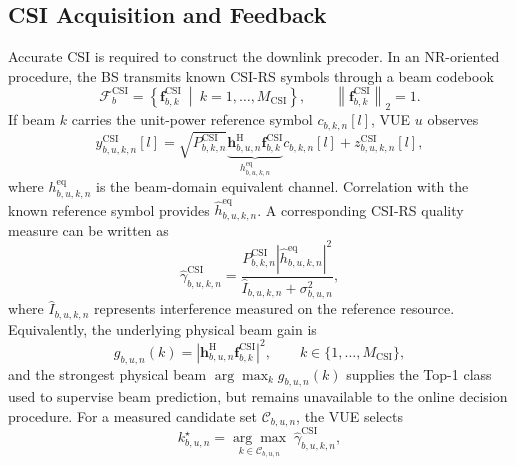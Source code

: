 \subsection{CSI Acquisition and Feedback}
\label{subsec:system-csi-feedback}

Accurate CSI is required to construct the downlink precoder.  In an NR-oriented
procedure, the BS transmits known CSI-RS symbols through a beam codebook
\begin{equation}
    \mathcal{F}^{\mathrm{CSI}}_b
    =\left\{\mathbf{f}^{\mathrm{CSI}}_{b,k}\ \middle|\
    k=1,\ldots,M_{\mathrm{CSI}}\right\},
    \qquad \left\|\mathbf{f}^{\mathrm{CSI}}_{b,k}\right\|_2=1.
    \label{eq:system-csi-codebook}
\end{equation}
If beam \(k\) carries the unit-power reference symbol \(c_{b,k,n}[l]\), VUE
\(u\) observes
\begin{equation}
    y^{\mathrm{CSI}}_{b,u,k,n}[l]
    =\sqrt{P^{\mathrm{CSI}}_{b,k,n}}
    \underbrace{\mathbf{h}^{\mathrm{H}}_{b,u,n}
    \mathbf{f}^{\mathrm{CSI}}_{b,k}}_{h^{\mathrm{eq}}_{b,u,k,n}}
    c_{b,k,n}[l]+z^{\mathrm{CSI}}_{b,u,k,n}[l],
    \label{eq:system-csirs-signal}
\end{equation}
where \(h^{\mathrm{eq}}_{b,u,k,n}\) is the beam-domain equivalent channel.
Correlation with the known reference symbol provides
\(\widehat{h}^{\mathrm{eq}}_{b,u,k,n}\).  A corresponding CSI-RS quality
measure can be written as
\begin{equation}
    \widehat{\gamma}^{\mathrm{CSI}}_{b,u,k,n}
    =\frac{P^{\mathrm{CSI}}_{b,k,n}
    \left|\widehat{h}^{\mathrm{eq}}_{b,u,k,n}\right|^2}
    {\widehat{I}_{b,u,k,n}+\sigma^2_{b,u,n}},
    \label{eq:system-csirs-sinr}
\end{equation}
where \(\widehat{I}_{b,u,k,n}\) represents interference measured on the
reference resource.  Equivalently, the underlying physical beam gain is
\begin{equation}
    g_{b,u,n}(k)
    =
    \left|\mathbf{h}^{\mathrm{H}}_{b,u,n}
    \mathbf{f}^{\mathrm{CSI}}_{b,k}\right|^2,
    \qquad k\in\{1,\ldots,M_{\mathrm{CSI}}\},
    \label{eq:system-beam-gain}
\end{equation}
and the strongest physical beam \(\arg\max_k g_{b,u,n}(k)\) supplies the
Top-1 class used to supervise beam prediction, but remains unavailable to the
online decision procedure.  For a measured candidate set
\(\mathcal{C}_{b,u,n}\), the VUE selects
\begin{equation}
    k^{\star}_{b,u,n}
    =
    \underset{k\in\mathcal{C}_{b,u,n}}{\arg\max}\;
    \widehat{\gamma}^{\mathrm{CSI}}_{b,u,k,n},
    \label{eq:system-service-beam}
\end{equation}
